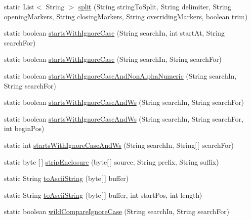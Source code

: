 \begin{DoxyCompactItemize}
\item 
static List$<$ String $>$ \mbox{\hyperlink{classcom_1_1mysql_1_1jdbc_1_1_string_utils_adf390b3d52e630b26eb77d692e4ed624}{split}} (String string\+To\+Split, String delimiter, String opening\+Markers, String closing\+Markers, String overriding\+Markers, boolean trim)
\item 
static boolean \mbox{\hyperlink{classcom_1_1mysql_1_1jdbc_1_1_string_utils_a4b1e5c86b08efa1656d9f2688fc00ec9}{starts\+With\+Ignore\+Case}} (String search\+In, int start\+At, String search\+For)
\item 
static boolean \mbox{\hyperlink{classcom_1_1mysql_1_1jdbc_1_1_string_utils_a3d79ea63bb33aa848246c4c41e1d4df0}{starts\+With\+Ignore\+Case}} (String search\+In, String search\+For)
\item 
static boolean \mbox{\hyperlink{classcom_1_1mysql_1_1jdbc_1_1_string_utils_a9e913ad5a1846fd695d58c3b7b3719de}{starts\+With\+Ignore\+Case\+And\+Non\+Alpha\+Numeric}} (String search\+In, String search\+For)
\item 
static boolean \mbox{\hyperlink{classcom_1_1mysql_1_1jdbc_1_1_string_utils_a6b08be3e1e6f1b48cd88d94373acd13b}{starts\+With\+Ignore\+Case\+And\+Ws}} (String search\+In, String search\+For)
\item 
static boolean \mbox{\hyperlink{classcom_1_1mysql_1_1jdbc_1_1_string_utils_a373e54e6ee0066339105f9372a0663e2}{starts\+With\+Ignore\+Case\+And\+Ws}} (String search\+In, String search\+For, int begin\+Pos)
\item 
static int \mbox{\hyperlink{classcom_1_1mysql_1_1jdbc_1_1_string_utils_aa21253db094aee0f6574a06c1076158c}{starts\+With\+Ignore\+Case\+And\+Ws}} (String search\+In, String\mbox{[}$\,$\mbox{]} search\+For)
\item 
static byte \mbox{[}$\,$\mbox{]} \mbox{\hyperlink{classcom_1_1mysql_1_1jdbc_1_1_string_utils_adaa51c3ab6d116872d9493d7d9bd4541}{strip\+Enclosure}} (byte\mbox{[}$\,$\mbox{]} source, String prefix, String suffix)
\item 
static String \mbox{\hyperlink{classcom_1_1mysql_1_1jdbc_1_1_string_utils_a8b353d590943a20a16b5f6772b1eac8a}{to\+Ascii\+String}} (byte\mbox{[}$\,$\mbox{]} buffer)
\item 
static String \mbox{\hyperlink{classcom_1_1mysql_1_1jdbc_1_1_string_utils_acb96fd30c2b868b8823a0b930d8aca49}{to\+Ascii\+String}} (byte\mbox{[}$\,$\mbox{]} buffer, int start\+Pos, int length)
\item 
static boolean \mbox{\hyperlink{classcom_1_1mysql_1_1jdbc_1_1_string_utils_a20d8547a5e865d12bac8f9ef9ba00834}{wild\+Compare\+Ignore\+Case}} (String search\+In, String search\+For)

\end{DoxyCompactItemize}
